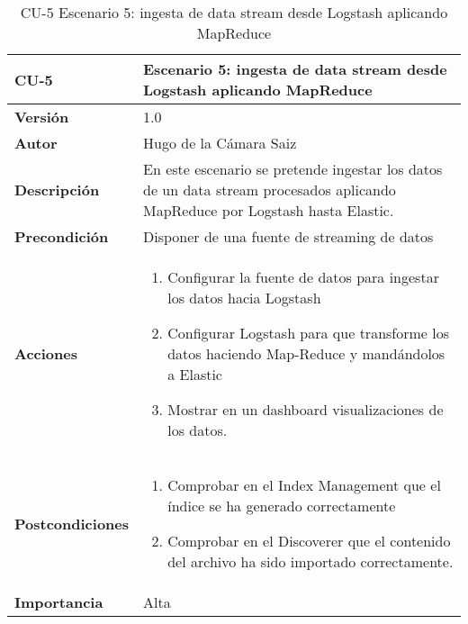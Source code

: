 \begin{table}[p]
	\centering
	\begin{tabularx}{\linewidth}{ p{} p{} }
		\toprule
		\textbf{CU-5}    & \textbf{Escenario 5: ingesta de data stream desde Logstash aplicando MapReduce}\\
		\toprule
		\textbf{Versión}              & 1.0    \\
		\textbf{Autor}                & Hugo de la Cámara Saiz \\
		\textbf{Descripción}          & En este escenario se pretende ingestar los datos de un data stream procesados aplicando MapReduce por Logstash hasta Elastic. \\
		\textbf{Precondición}         & Disponer de una fuente de streaming de datos  \\
		\textbf{Acciones}             &
		\begin{enumerate}
			\def\labelenumi{\arabic{enumi}.}
			\tightlist
			\item Configurar la fuente de datos para ingestar los datos hacia Logstash
                \item Configurar Logstash para que transforme los datos haciendo Map-Reduce y mandándolos a Elastic
                \item Mostrar en un dashboard visualizaciones de los datos.
		\end{enumerate}\\
                \textbf{Postcondiciones}             &
		\begin{enumerate}
			\def\labelenumi{\arabic{enumi}.}
			\tightlist
			\item Comprobar en el Index Management que el índice se ha generado correctamente
			\item Comprobar en el Discoverer que el contenido del archivo ha sido importado correctamente.
		\end{enumerate}\\
		\textbf{Importancia}          & Alta \\
		\bottomrule
	\end{tabularx}
	\caption{CU-5 Escenario 5: ingesta de data stream desde Logstash aplicando MapReduce}
\end{table}


